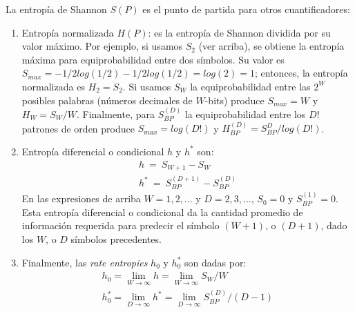 La entropía de Shannon $S(P)$ es el punto de partida para otros cuantificadores:
%
\begin{enumerate}
	\item Entropía normalizada $H(P)$: es la entropía de Shannon dividida por su valor máximo. Por ejemplo, si usamos $S_2$ (ver arriba), se obtiene la entropía máxima para equiprobabilidad entre dos símbolos. Su valor es $S_{max}=-1/2 log(1/2)-1/2 log(1/2)=log(2)=1$; entonces, la entropía normalizada es $H_2=S_2$. Si usamos $S_W$ la equiprobabilidad entre las $2^W$ posibles palabras (números decimales de $W$-bits) produce $S_{max}=W$ y $H_W=S_W/W$. Finalmente, para $S^{(D)}_{BP}$ la equiprobabilidad entre los $D!$ patrones de orden produce $S_{max}= log(D!)$ y $H^{(D)}_{BP}=S^D_{BP}/log(D!)$.
	\item Entropía diferencial o condicional $h$ y $h^*$ son:
	\begin{eqnarray}
	h~=~S_{W+1}-S_W\\
	h^*~=~S_{BP}^{(D+1)}-S_{BP}^{(D)}
	\end{eqnarray}
	En las expresiones de arriba $W=1,2,...$ y $D=2,3,...$, $S_0=0$ y $S_{BP}^{(1)}=0$. Esta entropía diferencial o condicional da la cantidad promedio de información requerida para predecir el símbolo $(W+1)$, o $(D+1)$, dado los $W$, o $D$ símbolos precedentes.
	\item Finalmente, las \emph{rate entropies} $h_0$ y $h_0^*$ \cite{Ebeling2001,Amigo2005} son dadas por:
	\begin{eqnarray}
	h_0=\lim\limits_{W\rightarrow \infty} h=\lim\limits_{W\rightarrow \infty}{S_{W}/W }\\
	h^*_0= \lim\limits_{D\rightarrow \infty} h^*=\lim\limits_{D\rightarrow \infty}{S^{(D)}_{BP}/(D-1)}
	\end{eqnarray}
\end{enumerate}

